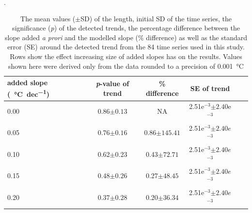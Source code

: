 \documentclass[]{ametsoc}
\begin{document}
%
\begin{table}[ht]
\caption{\small The mean values ($\pm$SD) of the length, initial SD of the time series, the significance (\emph{p}) of the detected trends, the percentage difference between the slope added \emph{a prori} and the modelled slope (\% difference) as well as the standard error (SE) around the detected trend from the 84 time series used in this study. Rows show the effect increasing size of added slopes has on the results. Values shown here were derived only from the data rounded to a precision of \SI{0.001}{\degreeCelsius}}.
\label{table01}
\centering
\begin{tabular}{lccccc}
  \hline
  added slope (\SI{}{\degreeCelsius~dec^{-1}}) & \emph{p}-value of trend & \% difference & SE of trend \\
  \hline
  0.00 & 0.86$\pm 0.13$ &      NA       & 2.51e$^{-3}$$\pm 2.40$e$^{-3}$ \\
  0.05 & 0.76$\pm 0.16$ & 0.86$\pm 145.41$ & 2.51e$^{-3}$$\pm 2.40e$$^{-3}$ \\
  0.10 & 0.62$\pm 0.23$ & 0.43$\pm 72.71$ & 2.51e$^{-3}$$\pm 2.40e$$^{-3}$ \\
  0.15 & 0.48$\pm 0.26$ & 0.27$\pm 48.45$ & 2.51e$^{-3}$$\pm 2.40e$$^{-3}$ \\
  0.20 & 0.37$\pm 0.28$ & 0.20$\pm 36.34$ & 2.51e$^{-3}$$\pm 2.40e$$^{-3}$ \\
   \hline
\end{tabular}
\end{table}
\end{document}
